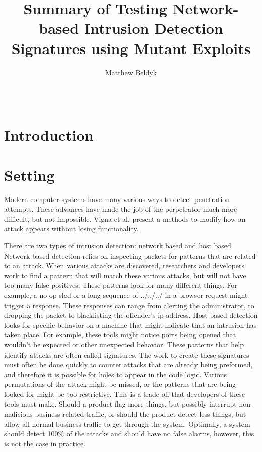 \documentclass{reading_glasses}
\begin{document}
\title{Summary of Testing Network-based Intrusion Detection Signatures using Mutant Exploits}

%
\author{
    \alignauthor
    Matthew Beldyk\\
    \\
    \\
}
\maketitle
\begin{abstract}
\end{abstract}

\section{Introduction}

\section{Setting}
Modern computer systems have many various ways to detect penetration attempts.  These advances have made the job of the perpetrator much more difficult, but not impossible. Vigna et al. present a methods to modify how an attack appears without losing functionality.  

There are two types of intrusion detection: network based and host based.  Network based detection relies on inspecting packets for patterns that are related to an attack.  When various attacks are discovered, researchers and developers work to find a pattern that will match these various attacks, but will not have too many false positives.  These patterns look for many different things.  For example, a no-op sled or a long sequence of ../../../ in a browser request might trigger a response.  These responses can range from alerting the administrator, to dropping the packet to blacklisting the offender’s ip address.  Host based detection looks for specific behavior on a machine that might indicate that an intrusion has taken place.  For example, these tools might notice ports being opened that wouldn’t be expected or other unexpected behavior. These patterns that help identify attacks are often called signatures.  The work to create these signatures must often be done quickly to counter attacks that are already being preformed, and therefore it is possible for holes to appear in the code logic.  Various permutations of the attack might be missed, or the patterns that are being looked for might be too restrictive.   This is a trade off that developers of these tools must make.  Should a product flag more things, but possibly interrupt non-malicious business related traffic, or should the product detect less things, but allow all normal business traffic to get through the system.  Optimally, a system should detect 100\% of the attacks and should have no false alarms, however, this is not the case in practice.
\end{document}
